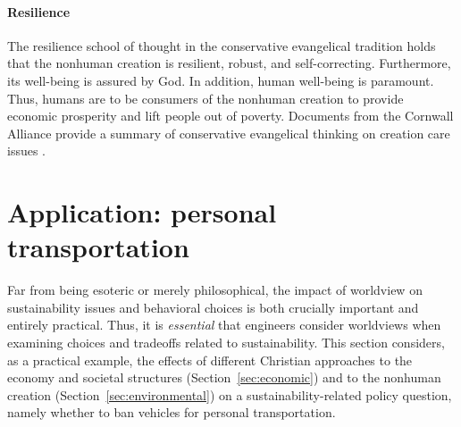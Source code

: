\documentclass[12pt]{article}
\begin{document}
\paragraph{Resilience} 
\label{sec:resilience}

The resilience school of thought in the conservative evangelical tradition
holds that the nonhuman creation is resilient, robust, and self-correcting.
Furthermore, its well-being is assured by God.
In addition, human well-being is paramount. 
Thus, humans are to be consumers of the nonhuman creation 
to provide economic prosperity and
lift people out of poverty.
Documents from the Cornwall Alliance 
provide a summary of conservative evangelical thinking on creation care issues
\autocite{Cornwall:2006aa}.



%
%
%

\section{Application: personal transportation}
\label{sec:personal_transportation}

Far from being esoteric or merely philosophical, 
the impact of worldview on sustainability issues and behavioral choices 
is both crucially important and entirely practical. 
Thus, it is \emph{essential} that engineers consider worldviews
when examining choices and tradeoffs related to sustainability.
This section considers, as a practical example, the effects of different Christian approaches
to the economy and societal structures (Section~\ref{sec:economic}) and
to the nonhuman creation (Section~\ref{sec:environmental})
on a sustainability-related policy question, 
namely whether to ban vehicles for personal transportation.
\end{document}
